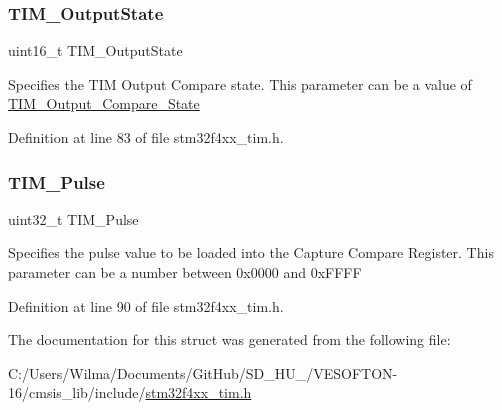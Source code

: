 \subsubsection{\texorpdfstring{T\+I\+M\+\_\+\+Output\+State}{TIM\_OutputState}}
{\footnotesize\ttfamily uint16\+\_\+t T\+I\+M\+\_\+\+Output\+State}

Specifies the T\+IM Output Compare state. This parameter can be a value of \hyperlink{group___t_i_m___output___compare___state}{T\+I\+M\+\_\+\+Output\+\_\+\+Compare\+\_\+\+State} 

Definition at line 83 of file stm32f4xx\+\_\+tim.\+h.

\mbox{\label{struct_t_i_m___o_c_init_type_def_afd7020848ac0ad264aa3c4687f3c3ec4}} 
\subsubsection{\texorpdfstring{T\+I\+M\+\_\+\+Pulse}{TIM\_Pulse}}
{\footnotesize\ttfamily uint32\+\_\+t T\+I\+M\+\_\+\+Pulse}

Specifies the pulse value to be loaded into the Capture Compare Register. This parameter can be a number between 0x0000 and 0x\+F\+F\+FF 

Definition at line 90 of file stm32f4xx\+\_\+tim.\+h.



The documentation for this struct was generated from the following file\+:\begin{DoxyCompactItemize}
\item 
C\+:/\+Users/\+Wilma/\+Documents/\+Git\+Hub/\+S\+D\+\_\+\+H\+U\+\_/\+V\+E\+S\+O\+F\+T\+O\+N-\/16/cmsis\+\_\+lib/include/\hyperlink{stm32f4xx__tim_8h}{stm32f4xx\+\_\+tim.\+h}\end{DoxyCompactItemize}
